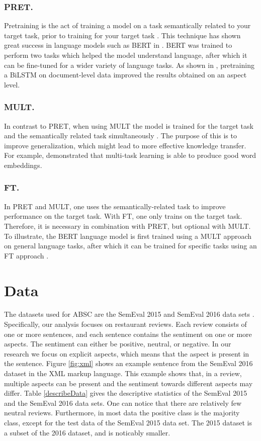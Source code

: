 \documentclass[runningheads]{llncs}
\begin{document}
\subsubsection*{PRET.}
Pretraining is the act of training a model on a task semantically related to your target task, prior to training for your target task \cite{Ruder2019, He2018}. This technique has shown great success in language models such as BERT in \cite{Devlin2019}. BERT was trained to perform two tasks which helped the model understand language, after which it can be fine-tuned for a wider variety of language tasks. As shown in \cite{He2018}, pretraining a BiLSTM on document-level data improved the results obtained on an aspect level. 

\subsubsection*{MULT.}
In contrast to PRET, when using MULT the model is trained for the target task and the semantically related task simultaneously \cite{Ruder2019}. The purpose of this is to improve generalization, which might lead to more effective knowledge transfer. For example, \cite{Subramanian2018} demonstrated that multi-task learning is able to produce good word embeddings.

\subsubsection*{FT.}
In PRET and MULT, one uses the semantically-related task to improve performance on the target task. With FT, one only trains on the target task. Therefore, it is necessary in combination with PRET, but optional with MULT. To illustrate, the BERT language model is first trained using a MULT approach on general language tasks, after which it can be trained for specific tasks using an FT approach \cite{Devlin2019}.

\section{Data}
\label{sec:data}

The datasets used for ABSC are the SemEval 2015 \cite{SemEval2015} and SemEval 2016 data sets \cite{SemEval2016}. Specifically, our analysis focuses on restaurant reviews. Each review consists of one or more sentences, and each sentence contains the sentiment on one or more aspects. The sentiment can either be positive, neutral, or negative. In our research we focus on explicit aspects, which means that the aspect is present in the sentence. Figure \ref{fig:xml} shows an example sentence from the SemEval 2016 dataset in the XML markup language. This example shows that, in a review, multiple aspects can be present and the sentiment towards different aspects may differ. Table \ref{describeData} gives the descriptive statistics of the SemEval 2015 and the SemEval 2016 data sets. One can notice that there are relatively few neutral reviews. Furthermore, in most data the positive class is the majority class, except for the test data of the SemEval 2015 data set. The 2015 dataset is a subset of the 2016 dataset, and is noticably smaller.
\end{document}
